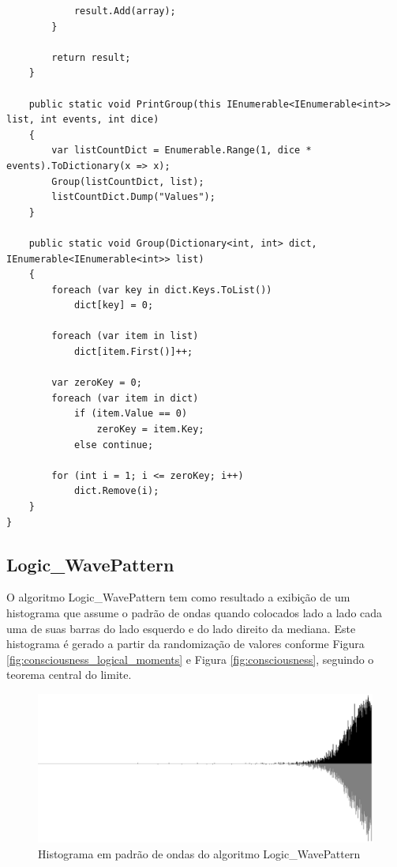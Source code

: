 \begin{apendicesenv}
\begin{lstlisting}
            result.Add(array);
        }

        return result;
    }
    
    public static void PrintGroup(this IEnumerable<IEnumerable<int>> list, int events, int dice)
    {
        var listCountDict = Enumerable.Range(1, dice * events).ToDictionary(x => x);
        Group(listCountDict, list);
        listCountDict.Dump("Values");
    }

    public static void Group(Dictionary<int, int> dict, IEnumerable<IEnumerable<int>> list)
    {
        foreach (var key in dict.Keys.ToList())
            dict[key] = 0;

        foreach (var item in list)
            dict[item.First()]++;

        var zeroKey = 0;
        foreach (var item in dict)
            if (item.Value == 0) 
                zeroKey = item.Key;
            else continue;

        for (int i = 1; i <= zeroKey; i++)
            dict.Remove(i);
    }
}

\end{lstlisting}


\bigbreak \bigbreak
\subsection*{Logic\_WavePattern}
O algoritmo Logic\_WavePattern tem como resultado a exibição de um histograma que assume o padrão de ondas quando colocados lado a lado cada uma de suas barras do lado esquerdo e do lado direito da mediana. Este histograma é gerado a partir da randomização de valores conforme Figura \ref{fig:consciousness_logical_moments} e Figura \ref{fig:consciousness}, seguindo o teorema central do limite.
	\begin{figure}[H]
	\caption{Histograma em padrão de ondas do algoritmo Logic\_WavePattern}
	\label{fig:logic_wavepattern_15000}
	\centering
	\includegraphics[scale=.25]{sections/images/logic_wavepattern_15000.jpg}
	\end{figure}


\end{apendicesenv}
